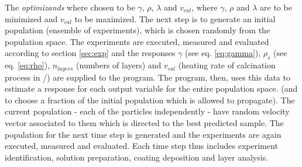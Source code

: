 The \textit{optimizands} where chosen to be $\gamma$, $\rho$, $\lambda$ and $v_{cal}$, 
where $\gamma$, $\rho$ and $\lambda$ are to be minimized and $v_{cal}$ to be maximized.
The next step is to generate an initial population (ensemble of experiments), which is chosen randomly from the population space. 
The experiments are executed, measured and evaluated according to section 
\ref{sec:exp} and the responses $\gamma$ (see eq. \ref{eq:gamma}), $\rho_s$ (see eq. \ref{eq:rho}), 
$n_{layers}$ (numbers of layers) and $v_{cal}$ (heating rate of calcination process in 
\oc{}/\minutes{}) are supplied to the program. 
The program, then, uses this data to estimate a response for each output variable 
for the entire population space.
(and to choose a fraction of the initial population which is allowed to propagate).
The current population - each of the particles independently - 
have random velocity vector associated to them which is directed to the best predicted sample. 
The population for the next time step is generated and the experiments are again executed, measured and evaluated.
Each time step thus includes experiment identification, solution preparation, coating deposition and layer analysis. 


